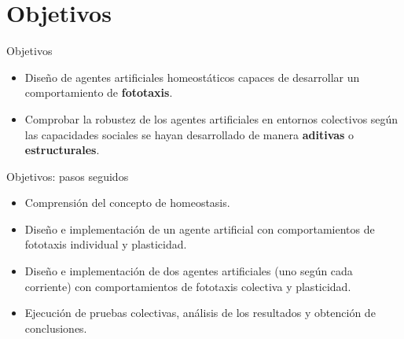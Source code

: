 \documentclass[aspectratio=169]{beamer}
\begin{document}
\section{Objetivos}
\begin{frame}{Objetivos}
  \begin{itemize}
  \item {Diseño de agentes artificiales homeostáticos capaces de desarrollar un comportamiento de \textbf{fototaxis}.}
  \item {Comprobar la robustez de los agentes artificiales en entornos colectivos según las capacidades sociales se hayan desarrollado de manera \textbf{aditivas} o \textbf{estructurales}.}
  \end{itemize}
\end{frame}

\begin{frame}{Objetivos: pasos seguidos}
  \begin{itemize}
  \item {Comprensión del concepto de homeostasis.}
  \item {Diseño e implementación de un agente artificial con comportamientos de fototaxis individual y plasticidad.}
  \item {Diseño e implementación de dos agentes artificiales (uno según cada corriente) con comportamientos de fototaxis colectiva y plasticidad.}
  \item {Ejecución de pruebas colectivas, análisis de los resultados y obtención de conclusiones.}
  \end{itemize}
\end{frame}
\end{document}
